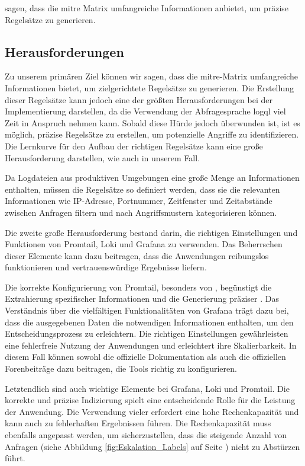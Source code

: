 sagen, dass die \gls{mitre} Matrix umfangreiche Informationen anbietet, um präzise Regelsätze zu generieren. 

\subsection{Herausforderungen}
Zu unserem primären Ziel können wir sagen, dass die \gls{mitre}-Matrix umfangreiche Informationen bietet, um zielgerichtete Regelsätze zu generieren. Die Erstellung dieser Regelsätze kann jedoch eine der größten Herausforderungen bei der Implementierung darstellen, da die Verwendung der Abfragesprache \gls{logql} viel Zeit in Anspruch nehmen kann. Sobald diese Hürde jedoch überwunden ist, ist es möglich, präzise Regelsätze zu erstellen, um potenzielle Angriffe zu identifizieren. Die Lernkurve für den Aufbau der richtigen Regelsätze kann eine große Herausforderung darstellen, wie auch in unserem Fall.

Da Logdateien aus produktiven Umgebungen eine große Menge an Informationen enthalten, müssen die Regelsätze so definiert werden, dass sie die relevanten Informationen wie IP-Adresse, Portnummer, Zeitfenster und Zeitabstände zwischen Anfragen filtern und nach Angriffsmustern kategorisieren können.

Die zweite große Herausforderung bestand darin, die richtigen Einstellungen und Funktionen von Promtail, Loki und Grafana zu verwenden. Das Beherrschen dieser Elemente kann dazu beitragen, dass die Anwendungen reibungslos funktionieren und vertrauenswürdige Ergebnisse liefern.

Die korrekte Konfigurierung von Promtail, besonders von , begünstigt die Extrahierung spezifischer Informationen und die Generierung präziser . Das Verständnis über die vielfältigen Funktionalitäten von Grafana trägt dazu bei, dass die ausgegebenen Daten die notwendigen Informationen enthalten, um den Entscheidungsprozess zu erleichtern. Die richtigen Einstellungen gewährleisten eine fehlerfreie Nutzung der Anwendungen und erleichtert ihre Skalierbarkeit. In diesem Fall können sowohl die offizielle Dokumentation als auch die offiziellen Forenbeiträge dazu beitragen, die Tools richtig zu konfigurieren.

Letztendlich sind  auch wichtige Elemente bei Grafana, Loki und Promtail. Die korrekte und präzise Indizierung spielt eine entscheidende Rolle für die Leistung der Anwendung. Die Verwendung vieler  erfordert eine hohe Rechenkapazität und kann auch zu fehlerhaften Ergebnissen führen. Die Rechenkapazität muss ebenfalls angepasst werden, um sicherzustellen, dass die steigende Anzahl von Anfragen (siehe Abbildung \ref{fig:Eskalation_Labels} auf Seite \pageref{fig:Eskalation_Labels}) nicht zu Abstürzen führt.

